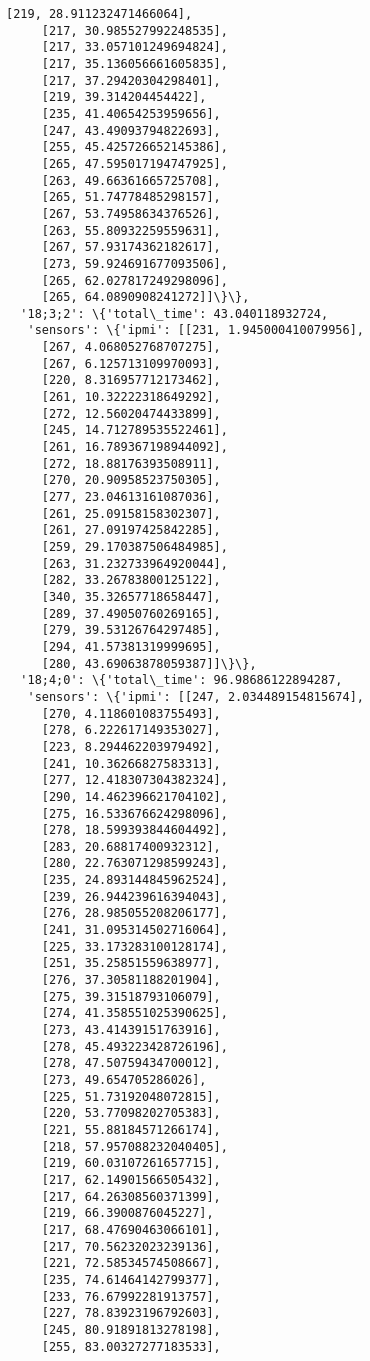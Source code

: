 \documentclass[11pt]{article}
\begin{document}
\begin{tcolorbox}[breakable, size=fbox, boxrule=.5pt, pad at break*=1mm, opacityfill=0]
\begin{Verbatim}[commandchars=\\\{\}]
     [219, 28.911232471466064],
     [217, 30.985527992248535],
     [217, 33.057101249694824],
     [217, 35.136056661605835],
     [217, 37.29420304298401],
     [219, 39.314204454422],
     [235, 41.40654253959656],
     [247, 43.49093794822693],
     [255, 45.425726652145386],
     [265, 47.595017194747925],
     [263, 49.66361665725708],
     [265, 51.74778485298157],
     [267, 53.74958634376526],
     [263, 55.80932259559631],
     [267, 57.93174362182617],
     [273, 59.924691677093506],
     [265, 62.027817249298096],
     [265, 64.0890908241272]]\}\},
  '18;3;2': \{'total\_time': 43.040118932724,
   'sensors': \{'ipmi': [[231, 1.945000410079956],
     [267, 4.068052768707275],
     [267, 6.125713109970093],
     [220, 8.316957712173462],
     [261, 10.32222318649292],
     [272, 12.56020474433899],
     [245, 14.712789535522461],
     [261, 16.789367198944092],
     [272, 18.88176393508911],
     [270, 20.90958523750305],
     [277, 23.04613161087036],
     [261, 25.09158158302307],
     [261, 27.09197425842285],
     [259, 29.170387506484985],
     [263, 31.232733964920044],
     [282, 33.26783800125122],
     [340, 35.32657718658447],
     [289, 37.49050760269165],
     [279, 39.53126764297485],
     [294, 41.57381319999695],
     [280, 43.69063878059387]]\}\},
  '18;4;0': \{'total\_time': 96.98686122894287,
   'sensors': \{'ipmi': [[247, 2.034489154815674],
     [270, 4.118601083755493],
     [278, 6.222617149353027],
     [223, 8.294462203979492],
     [241, 10.36266827583313],
     [277, 12.418307304382324],
     [290, 14.462396621704102],
     [275, 16.533676624298096],
     [278, 18.599393844604492],
     [283, 20.68817400932312],
     [280, 22.763071298599243],
     [235, 24.893144845962524],
     [239, 26.944239616394043],
     [276, 28.985055208206177],
     [241, 31.095314502716064],
     [225, 33.173283100128174],
     [251, 35.25851559638977],
     [276, 37.30581188201904],
     [275, 39.31518793106079],
     [274, 41.358551025390625],
     [273, 43.41439151763916],
     [278, 45.493223428726196],
     [278, 47.50759434700012],
     [273, 49.654705286026],
     [225, 51.73192048072815],
     [220, 53.77098202705383],
     [221, 55.88184571266174],
     [218, 57.957088232040405],
     [219, 60.03107261657715],
     [217, 62.14901566505432],
     [217, 64.26308560371399],
     [219, 66.3900876045227],
     [217, 68.47690463066101],
     [217, 70.56232023239136],
     [221, 72.58534574508667],
     [235, 74.61464142799377],
     [233, 76.67992281913757],
     [227, 78.83923196792603],
     [245, 80.91891813278198],
     [255, 83.00327277183533],

\end{Verbatim}
\end{tcolorbox}
\end{document}
